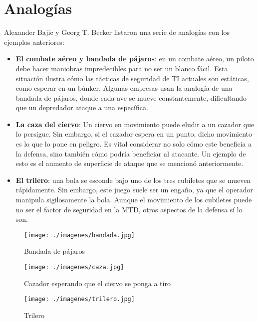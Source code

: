 \section{Analogías}

Alexander Bajic y Georg T. Becker listaron una serie de analogías\cite{MTD-critica} con los ejemplos anteriores:
\begin{itemize}
    \item \textbf{El combate aéreo y bandada de pájaros}: en un combate aéreo, un piloto debe hacer maniobras impredecibles para no ser un blanco fácil. Esta situación ilustra cómo las tácticas de seguridad de TI actuales son estáticas, como esperar en un búnker. Algunas empresas usan la analogía de una bandada de pájaros, donde cada ave se mueve constantemente, dificultando que un depredador ataque a una específica.
    \item \label{caza}\textbf{La caza del ciervo}: Un ciervo en movimiento puede eludir a un cazador que lo persigue. Sin embargo, si el cazador espera en un punto, dicho movimiento es lo que lo pone en peligro. Es vital considerar no solo cómo este beneficia a la defensa, sino también cómo podría beneficiar al atacante. Un ejemplo de esto es el aumento de superficie de ataque que se mencionó anteriormente.
    \item \textbf{El trilero}: una bola se esconde bajo uno de los tres cubiletes que se mueven rápidamente. Sin embargo, este juego suele ser un engaño, ya que el operador manipula sigilosamente la bola. Aunque el movimiento de los cubiletes puede no ser el factor de seguridad en la MTD, otros aspectos de la defensa sí lo son.
\end{itemize}

\begin{figure}[h]
    \centering
    \begin{minipage}{.3\textwidth}
        \centering
        \texttt{[image: ./imagenes/bandada.jpg]}
        \caption{Bandada de pájaros\cite{bandada-pajaros}}
    \end{minipage}
    \hfill
    \begin{minipage}{.3\textwidth}
        \centering
        \texttt{[image: ./imagenes/caza.jpg]}
        \caption{Cazador esperando que el ciervo se ponga a tiro\cite{caza}}
    \end{minipage}
    \hfill
    \begin{minipage}{.3\textwidth}
        \centering
        \texttt{[image: ./imagenes/trilero.jpg]}
        \caption{Trilero\cite{trilero}}
    \end{minipage}
\end{figure}
